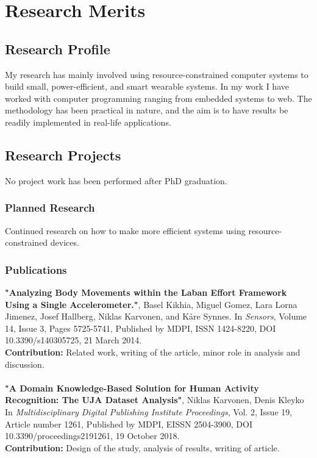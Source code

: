 \documentclass{article}
\begin{document}
\section{Research Merits}
\subsection{Research Profile}
My research has mainly involved using resource-constrained computer systems to build small, power-efficient, and smart wearable systems. In my work I have worked with computer programming ranging from embedded systems to web. The methodology has been practical in nature, and the aim is to have results be readily implemented in real-life applications.

\subsection{Research Projects}
No project work has been performed after PhD graduation.

\subsubsection{Planned Research}
Continued research on how to make more efficient systems using resource-constrained devices.

\subsubsection{Publications}
\textbf{"Analyzing Body Movements within the Laban Effort Framework Using a Single Accelerometer."}, 
Basel Kikhia, Miguel Gomez, Lara Lorna Jimenez, Josef Hallberg, Niklas Karvonen, and Kåre Synnes.
In \textit{ Sensors}, Volume 14, Issue 3, Pages 5725-5741, 
Published by MDPI, ISSN 1424-8220, 
DOI 10.3390/s140305725, 
21 March 2014. \\
\textbf{Contribution:} Related work, writing of the article, minor role in analysis and discussion.
\\ \\

\textbf{ "A Domain Knowledge-Based Solution for Human Activity Recognition: The UJA Dataset Analysis"},
Niklas Karvonen, Denis Kleyko
In \textit{ Multidisciplinary Digital Publishing Institute Proceedings}, Vol. 2, Issue 19, Article number 1261, 
Published by MDPI, EISSN 2504-3900, 
DOI 10.3390/proceedings2191261, 
19 October 2018.\\
\textbf{Contribution:} Design of the study, analysis of results, writing of article.
\\ \\
\end{document}
